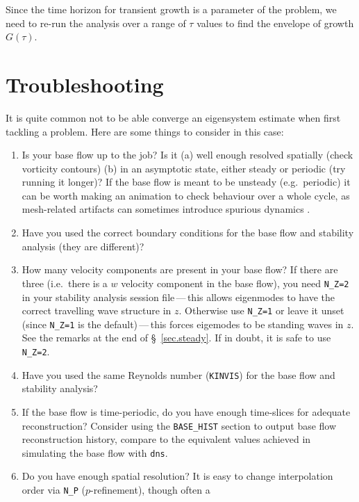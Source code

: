 \documentclass[11pt,a4paper]{report}
\newcommand{\eg}{e.g.\ }
\begin{document}
Since the time horizon for transient growth is a parameter of the
problem, we need to re-run the analysis over a range of $\tau$ values
to find the envelope of growth $G(\tau)$.

\chapter{Troubleshooting}
\label{sec.trouble}

It is quite common not to be able converge an eigensystem estimate
when first tackling a problem.  Here are some things to consider in
this case:

\begin{enumerate}
\item
Is your base flow up to the job?  Is it (a) well enough resolved
spatially (check vorticity contours) (b) in an asymptotic state,
either steady or periodic (try running it longer)? If the base flow is
meant to be unsteady (\eg periodic) it can be worth making an
animation to check behaviour over a whole cycle, as mesh-related
artifacts can sometimes introduce spurious dynamics \citep[see \eg
  \S\,4.1 of][]{bbs08b}.
\item
Have you used the correct boundary conditions for the base flow and
stability analysis (they are different)?
\item
How many velocity components are present in your base flow?  If there
are three (i.e.\ there is a $w$ velocity component in the base flow),
you need \verb+N_Z=2+ in your stability analysis session
file\,---\,this allows eigenmodes to have the correct travelling wave
structure in $z$.  Otherwise use \verb+N_Z=1+ or leave it unset (since
\verb+N_Z=1+ is the default)\,---\,this forces eigemodes to be
standing waves in $z$. See the remarks at the end of
\S~\ref{sec.steady}.  If in doubt, it is safe to use \verb+N_Z=2+.
\item
Have you used the same Reynolds number (\verb+KINVIS+) for the base
flow and stability analysis?
\item
If the base flow is time-periodic, do you have enough time-slices for
adequate reconstruction?  Consider using the \verb+BASE_HIST+ section
to output base flow reconstruction history, compare to the equivalent
values achieved in simulating the base flow with \verb+dns+.
\item
Do you have enough spatial resolution? It is easy to change
interpolation order via \verb+N_P+ ($p$-refinement), though often a

\end{enumerate}
\end{document}

